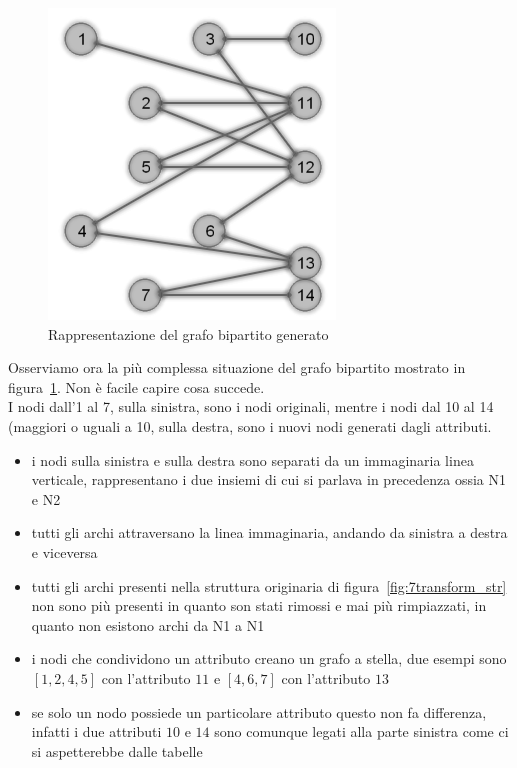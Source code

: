 %
\begin{figure}[htp]
	\centering
	\includegraphics{immagini/7transform_bipartite}
	\caption{Rappresentazione del grafo bipartito generato}
	\label{fig:7transform_bipartite}
\end{figure}
%
Osserviamo ora la più complessa situazione del grafo bipartito mostrato in figura~\ref{fig:7transform_bipartite}. Non è facile capire cosa succede.\\
I nodi dall'1 al 7, sulla sinistra, sono i nodi originali, mentre i nodi dal 10 al 14 (maggiori o uguali a 10, sulla destra, sono i nuovi nodi generati dagli attributi.
\begin{itemize}
	\item i nodi sulla sinistra e sulla destra sono separati da un immaginaria linea verticale, rappresentano i due insiemi di cui si parlava in precedenza ossia N1 e N2
	\item tutti gli archi attraversano la linea immaginaria, andando da sinistra a destra e viceversa
	\item tutti gli archi presenti nella struttura originaria di figura~\ref{fig:7transform_str} non sono più presenti in quanto son stati rimossi e mai più rimpiazzati, in quanto non esistono archi da N1 a N1
	\item i nodi che condividono un attributo creano un grafo a stella, due esempi sono $[1,2,4,5]$ con l'attributo $11$ e $[4,6,7]$ con l'attributo $13$
	\item se solo un nodo possiede un particolare attributo questo non fa differenza, infatti i due attributi $10$ e $14$ sono comunque legati alla parte sinistra come ci si aspetterebbe dalle tabelle
\end{itemize}
%
%
%
